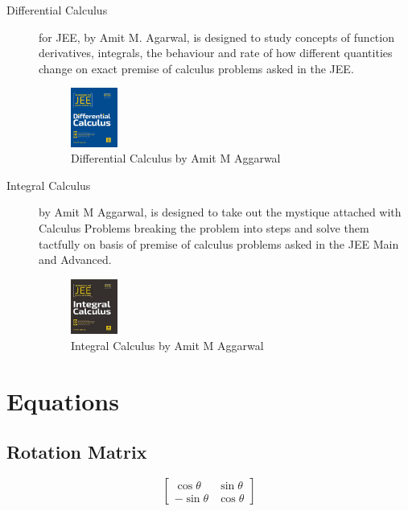 \documentclass{article}
\begin{document}
\begin{description}
    \item [Differential Calculus] for JEE, by Amit M. Agarwal, is designed to study concepts of function derivatives, integrals, the behaviour and rate of how different quantities change on exact premise of calculus problems asked in the JEE.
        
        \begin{figure}[htp]
        	\begin{center}
        		\includegraphics[width=0.15\textwidth]{Diff_Calc}
        	\end{center}
        \label{fig: Diff_Calc}
        \caption{Differential Calculus by Amit M Aggarwal}
        \end{figure}
    
    \item [Integral Calculus] by Amit M Aggarwal, is designed to take out the mystique attached with Calculus Problems breaking the problem into steps and solve them tactfully on basis of premise of calculus problems asked in the JEE Main and Advanced.
        
        \begin{figure}[htp]
        	\begin{center}
        		\includegraphics[width=0.15\textwidth]{Integral_Calc}
        	\end{center}
        \label{fig: Integral_Calc}
        \caption{Integral Calculus by Amit M Aggarwal}
        \end{figure}
    
    	\end{description}
    
    \section{Equations}
    
    \subsection{Rotation Matrix}
\[   \begin{bmatrix}
    	\cos \theta & \sin \theta \\
    	-\sin \theta & \cos \theta
    \end{bmatrix}   \]
\end{document}

